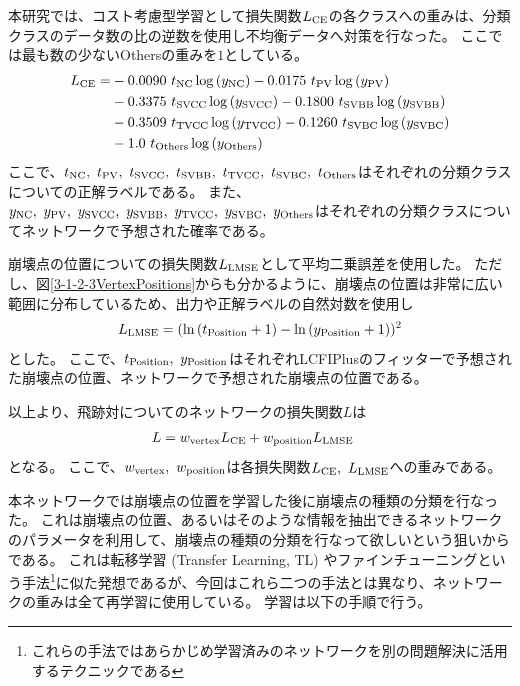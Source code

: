 本研究では、コスト考慮型学習として損失関数$L_{\rm CE}$の各クラスへの重みは、分類クラスのデータ数の比の逆数を使用し不均衡データへ対策を行なった。
ここでは最も数の少ないOthersの重みを$1$としている。
\begin{equation}
 \begin{split}
 L_{\rm CE} = & - 0.0090\  t_{\rm NC} \log{(y_{\rm NC})} - 0.0175\  t_{\rm PV} \log{(y_{\rm PV})} \\
       & - 0.3375\  t_{\rm SVCC} \log{(y_{\rm SVCC})} - 0.1800\  t_{\rm SVBB} \log{(y_{\rm SVBB})}\\
       & - 0.3509\  t_{\rm TVCC} \log{(y_{\rm TVCC})} - 0.1260\  t_{\rm SVBC} \log{(y_{\rm SVBC})}\\
       & - 1.0\  t_{\rm Others} \log{(y_{\rm Others})}\\
 \end{split}
\end{equation}
ここで、$t_{\rm NC},\ t_{\rm PV},\ t_{\rm SVCC},\ t_{\rm SVBB},\ t_{\rm TVCC},\ t_{\rm SVBC},\ t_{\rm Others}$はそれぞれの分類クラスについての正解ラベルである。
また、$y_{\rm NC},\ y_{\rm PV},\ y_{\rm SVCC},\ y_{\rm SVBB},\ y_{\rm TVCC},\ y_{\rm SVBC},\ y_{\rm Others}$はそれぞれの分類クラスについてネットワークで予想された確率である。

崩壊点の位置についての損失関数$L_{\rm LMSE}$として平均二乗誤差を使用した。
ただし、図\ref{3-1-2-3VertexPositions}からも分かるように、崩壊点の位置は非常に広い範囲に分布しているため、出力や正解ラベルの自然対数を使用し
\begin{equation}
 \begin{split}
 L_{\rm LMSE} = (\ln{(t_{\rm Position}+1)} - \ln{(y_{\rm Position}+1)})^2
 \end{split}
\end{equation}
とした。
ここで、$t_{\rm Position},\ y_{\rm Position}$はそれぞれLCFIPlusのフィッターで予想された崩壊点の位置、ネットワークで予想された崩壊点の位置である。

以上より、飛跡対についてのネットワークの損失関数$L$は
\begin{equation}
 \begin{split}
 L & = w_{\rm vertex} L_{\rm CE} + w_{\rm position} L_{\rm LMSE}
 \end{split}
\end{equation}
となる。
ここで、$w_{\rm vertex},\ w_{\rm position}$は各損失関数$L_{\rm CE},\ L_{\rm LMSE}$への重みである。

本ネットワークでは崩壊点の位置を学習した後に崩壊点の種類の分類を行なった。
これは崩壊点の位置、あるいはそのような情報を抽出できるネットワークのパラメータを利用して、崩壊点の種類の分類を行なって欲しいという狙いからである。
これは転移学習 (Transfer Learning, TL) やファインチューニングという手法\footnote{これらの手法ではあらかじめ学習済みのネットワークを別の問題解決に活用するテクニックである}に似た発想であるが、今回はこれら二つの手法とは異なり、ネットワークの重みは全て再学習に使用している。
学習は以下の手順で行う。


